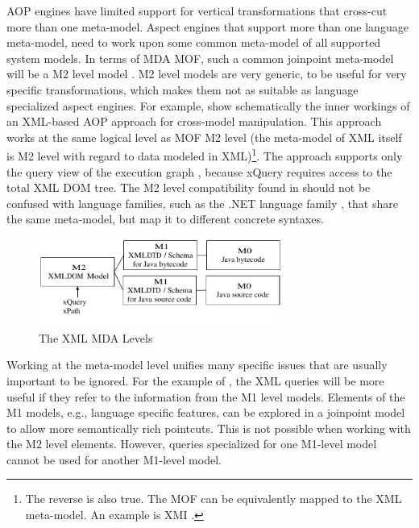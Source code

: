 \begin{itemize}
AOP engines have limited support for vertical transformations that cross-cut more than one meta-model. Aspect engines that support more than one language meta-model, need to work upon some common meta-model of all supported system models. In terms of MDA MOF, such a common joinpoint meta-model will be a M2 level model . M2 level models are very generic, to be useful for very specific transformations, which makes them not as suitable as language specialized aspect engines. For example,  show schematically the inner workings of an XML-based AOP approach \cite{XIRC} for cross-model manipulation. This approach works at the same logical level as MOF M2 level (the meta-model of XML itself is M2 level with regard to data modeled in XML)\footnote{The reverse is also true. The MOF can be equivalently mapped to the XML meta-model. An example is XMI \cite{mda.frankel}.}. The approach supports only the query view of the execution graph , because xQuery \cite{www.xQuery} requires access to the total XML DOM tree. The M2 level compatibility found in \cite{XIRC} should not be confused with language families, such as the .NET language family \cite{Weave.NET}, that share the same meta-model, but map it to different concrete syntaxes.

\begin{figure}[ht]
	\begin{center}
		\includegraphics[width=8cm,height=!]{ch03/xml}
	\end{center}
	\caption{The XML MDA Levels}
	\label{fig:xml-mda}
\end{figure}

Working at the meta-model level unifies many specific issues that are usually important to be ignored. For the example of , the XML queries will be more useful if they refer to the information from the M1 level models. Elements of the M1 models, e.g., language specific features, can be explored in a joinpoint model to allow more semantically rich pointcuts. This is not possible when working with the M2 level elements. However, queries specialized for one M1-level model cannot be used for another M1-level model.


\end{itemize}
